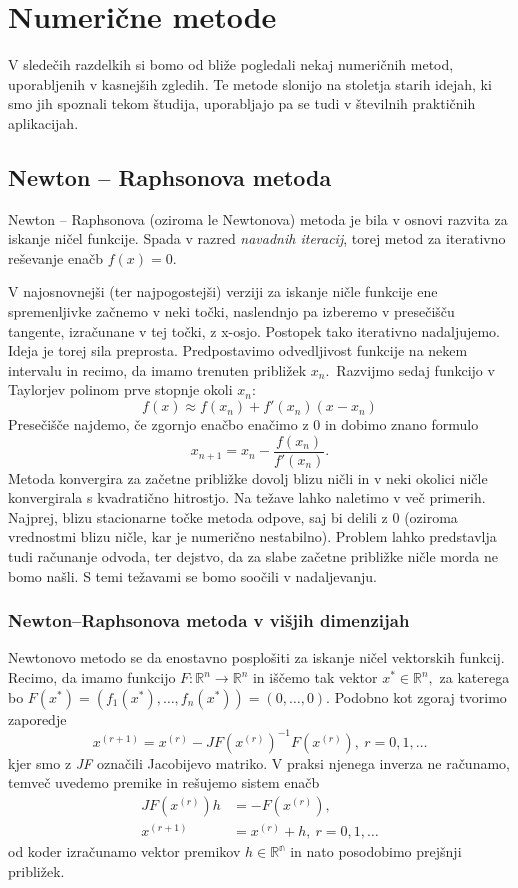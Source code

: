\documentclass[12pt,a4paper]{amsart}
\theoremstyle{definition} %
\theoremstyle{plain} %
\begin{document}
\section{Numerične metode}
V sledečih razdelkih si bomo od bliže pogledali nekaj numeričnih metod, uporabljenih v kasnejših zgledih. Te metode slonijo na stoletja starih
idejah, ki smo jih spoznali tekom študija, uporabljajo pa se tudi v številnih praktičnih aplikacijah.
\subsection{Newton -- Raphsonova metoda} \label{nr}
Newton -- Raphsonova (oziroma le Newtonova) metoda je bila v osnovi razvita za iskanje ničel funkcije. Spada v razred \textit{navadnih iteracij}, torej metod za iterativno
reševanje enačb $f(x) = 0.$%

V najosnovnejši (ter najpogostejši) verziji za iskanje
ničle funkcije ene spremenljivke začnemo v neki točki, naslendnjo pa izberemo v presečišču tangente, izračunane v 
tej točki, z x-osjo. Postopek tako iterativno nadaljujemo. Ideja je torej sila preprosta.
Predpostavimo odvedljivost funkcije na nekem intervalu in recimo, da imamo trenuten približek $x_{n}.$~Razvijmo sedaj funkcijo v Taylorjev
polinom prve stopnje okoli $x_{n}$:
\[
    f(x) \approx f(x_{n}) + f'(x_{n})(x - x_{n})
\]
Presečišče najdemo, če zgornjo enačbo enačimo z 0 in dobimo znano formulo
\[
    x_{n+1} = x_{n} - \frac{f(x_{n})}{f'(x_{n})}.
\]
Metoda konvergira za začetne približke dovolj blizu ničli in v neki okolici ničle konvergirala s kvadratično hitrostjo. 
Na težave lahko naletimo v več primerih. Najprej, blizu stacionarne točke metoda odpove, saj bi delili z 0 (oziroma vrednostmi blizu ničle, kar je numerično nestabilno).
Problem lahko predstavlja tudi računanje odvoda, ter dejstvo, da za slabe začetne približke ničle morda ne bomo našli. S temi 
težavami se bomo soočili v nadaljevanju.

\subsubsection{Newton--Raphsonova metoda v višjih dimenzijah}
Newtonovo metodo se da enostavno posplošiti za iskanje ničel vektorskih funkcij. Recimo, da imamo funkcijo $F:\mathbb{R}^{n} \rightarrow \mathbb{R}^{n}$ in iščemo tak
vektor $x^{*} \in \mathbb{R}^{n},$ za katerega bo \linebreak $F(x^{*}) = (f_{1}(x^{*}),\ldots,f_{n}(x^{*})) = (0,\ldots,0).$
Podobno kot zgoraj tvorimo zaporedje
\[
    x^{(r+1)} = x^{(r)} - JF(x^{(r)})^{-1}F(x^{(r)}),~r=0,1,\ldots
\]
kjer smo z \textit{JF} označili Jacobijevo matriko. V praksi njenega inverza ne računamo, temveč uvedemo premike in rešujemo sistem enačb
\begin{align*}
    JF(x^{(r)}) h &= -F(x^{(r)}),\\
    x^{(r+1)} &= x^{(r)} + h,~r=0,1,\ldots
\end{align*}
od koder izračunamo vektor premikov $h \in \mathbb{R^n}$ in nato posodobimo prejšnji približek.
\end{document}
